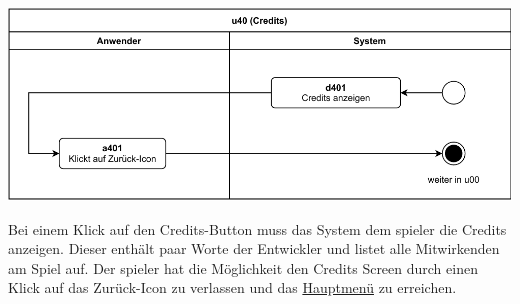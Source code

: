\vspace*{1cm}

\includegraphics[width=\linewidth]{diagramme/pdf/UML-Activity-u40.pdf}
\label{fig:dia:credits}
\vspace*{0.5cm}

Bei einem Klick auf den Credits-Button muss das System dem \gls{spieler} die Credits anzeigen. 
Dieser enthält paar Worte der Entwickler und listet alle Mitwirkenden am Spiel auf. 
Der \gls{spieler} hat die Möglichkeit den Credits Screen durch einen Klick auf das Zurück-Icon zu verlassen und das \hyperref[fig:dia:mainMenu]{Hauptmenü} zu erreichen.

\clearpage





